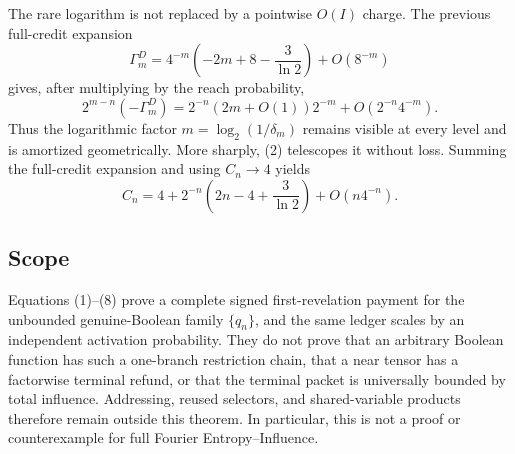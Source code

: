 The rare logarithm is not replaced by a pointwise $O(I)$ charge.  The
previous full-credit expansion
\[
 \Gamma_m^D=4^{-m}\left(-2m+8-\frac3{\ln2}\right)+O(8^{-m})
\]
gives, after multiplying by the reach probability,
\[
 2^{m-n}(-\Gamma_m^D)
 =2^{-n}\left(2m+O(1)\right)2^{-m}+O(2^{-n}4^{-m}).              \tag{7}
\]
Thus the logarithmic factor $m=\log_2(1/\delta_m)$ remains visible at
every level and is amortized geometrically.  More sharply, (2) telescopes it
without loss.  Summing the full-credit expansion and using $C_n\to4$ yields
\[
 C_n=4+2^{-n}\left(2n-4+\frac3{\ln2}\right)+O(n4^{-n}).          \tag{8}
\]

\subsection*{Scope}

Equations (1)--(8) prove a complete signed first-revelation payment for the
unbounded genuine-Boolean family $\{q_n\}$, and the same ledger scales by an
independent activation probability.  They do not prove that an arbitrary
Boolean function has such a one-branch restriction chain, that a near tensor
has a factorwise terminal refund, or that the terminal packet is universally
bounded by total influence.  Addressing, reused selectors, and shared-variable
products therefore remain outside this theorem.  In particular, this is not
a proof or counterexample for full Fourier Entropy--Influence.
